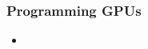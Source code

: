 %
%
%
%


\begin{frame}[fragile]
%
  \frametitle{Programming GPUs}
%
  \begin{itemize}
%
  \item 
%
  \end{itemize}
%
\end{frame}

